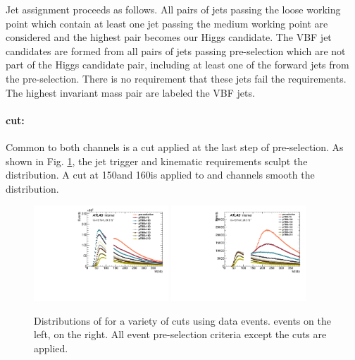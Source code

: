 Jet assignment proceeds as follows.  All pairs of \btagged jets passing the loose working point which contain at least one jet passing the medium working point are considered and the highest \pT pair becomes our Higgs candidate.  The VBF jet candidates are formed from all pairs of jets passing pre-selection which are not part of the Higgs candidate pair,  including at least one of the forward jets from the pre-selection.  There is no requirement that these jets fail  the \btagging requirements. The highest invariant mass pair are labeled the VBF jets. 



\paragraph{\pTbb cut:} Common to both channels is a \pTbb cut applied at the last step of pre-selection. As shown in Fig. \ref{fig:vbf-mbb_ptcuts}, the jet trigger and kinematic requirements sculpt the \Mbb distribution. A \pTbb cut at 150\GeV and 160\GeV is applied to \fourcentral and \twocentral channels smooth the \Mbb distribution.

\begin{figure}[htbp]
  \centering
 \includegraphics[width=0.45\textwidth]{figures/VBF/Presel-Mbb_4cen.pdf}
 \includegraphics[width=0.45\textwidth]{figures/VBF/Presel-Mbb_2cen.pdf}
 \caption{Distributions of \Mbb for a variety of \pTbb cuts using data events.  \fourcentral events on the left, \twocentral on the right.  All event pre-selection criteria except the \pTbb cuts are applied.}
  \label{fig:vbf-mbb_ptcuts}
\end{figure}


